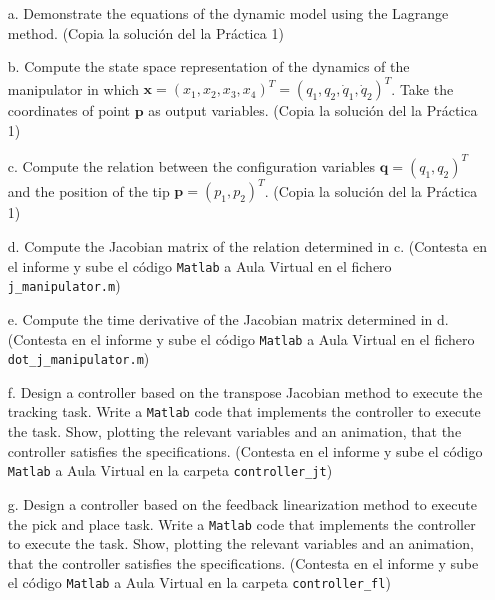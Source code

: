 \documentclass{article}
\begin{document}
\begin{itemize}
\item[a.] Demonstrate the equations of the dynamic model using the Lagrange method. (Copia la soluci\'on del la Pr\'actica 1)



\item[b.] 
Compute the state space representation of the dynamics of the manipulator in which $\mathbf{x} = (x_1,x_2,x_3,x_4)^T= (q_1, q_2, \dot{q}_1, \dot{q}_2)^T$. Take the coordinates of point $\mathbf{p}$ as output variables. (Copia la soluci\'on del la Pr\'actica 1)
 
\item[c.]
Compute the relation between the configuration variables 
$\mathbf{q} =(q_1, q_2)^T$ 
and the position of the tip $\mathbf{p} = (p_1, p_2)^T$.
(Copia la soluci\'on del la Pr\'actica 1)

\item[d.]
Compute the Jacobian matrix of the relation determined in c. (Contesta en el informe y sube el c\'odigo \texttt{Matlab} a Aula Virtual en el fichero \texttt{j\_manipulator.m})

\item[e.] 
Compute the time derivative of the Jacobian matrix determined in d. (Contesta en el informe y sube el c\'odigo \texttt{Matlab} a Aula Virtual en el fichero \texttt{dot\_j\_manipulator.m})



\item[f.]  Design a controller based on the transpose Jacobian method to execute the tracking task. Write a \texttt{Matlab} code that implements the controller to execute the task. Show, plotting the relevant variables and an animation, that the controller satisfies the specifications. (Contesta en el informe y sube el c\'odigo \texttt{Matlab} a Aula Virtual en la carpeta \texttt{controller\_jt})


\item[g.] Design a controller based on the feedback linearization method to execute the pick and place task. Write a \texttt{Matlab} code that implements the controller to execute the task. Show, plotting the relevant variables and an animation, that the controller satisfies the specifications. (Contesta en el informe y sube el c\'odigo \texttt{Matlab} a Aula Virtual en la carpeta \texttt{controller\_fl})


\end{itemize}
\end{document}
